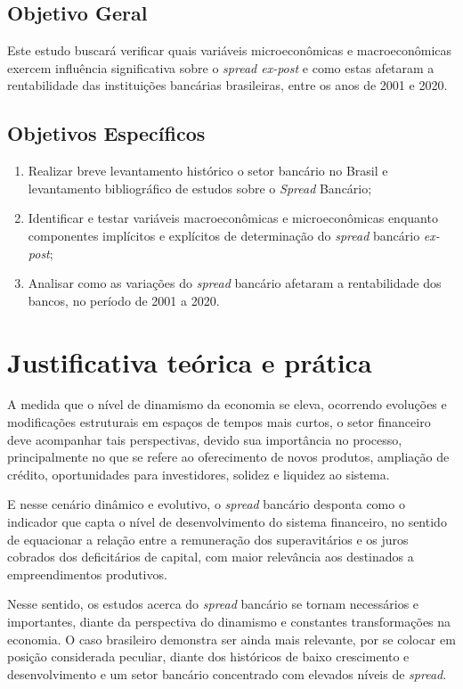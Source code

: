 \documentclass[12pt,12pt,openright,oneside,a4paper,chapter=TITLE,section=TITLE,subsection=TITLE,subsubsection=TITLE,english,french,spanish,portugues,sumario=tradicional]{abntex2}
\providecommand{\tightlist}{%
  \setlength{\itemsep}{0pt}\setlength{\parskip}{0pt}}
\begin{document}
\subsection{Objetivo Geral}

Este estudo buscará verificar quais variáveis microeconômicas e macroeconômicas exercem influência significativa sobre o \emph{spread ex-post} e como estas afetaram a rentabilidade das instituições bancárias brasileiras, entre os anos de 2001 e 2020.

\subsection{Objetivos Específicos}

\begin{enumerate}
\def\labelenumi{\arabic{enumi}.}
\tightlist
\item
  Realizar breve levantamento histórico o setor bancário no Brasil e levantamento bibliográfico de estudos sobre o \emph{Spread} Bancário;
\item
  Identificar e testar variáveis macroeconômicas e microeconômicas enquanto componentes implícitos e explícitos de determinação do \emph{spread} bancário \emph{ex-post};
\item
  Analisar como as variações do \emph{spread} bancário afetaram a rentabilidade dos bancos, no período de 2001 a 2020.
\end{enumerate}

\section{Justificativa teórica e prática}

A medida que o nível de dinamismo da economia se eleva, ocorrendo evoluções e modificações estruturais em espaços de tempos mais curtos, o setor financeiro deve acompanhar tais perspectivas, devido sua importância no processo, principalmente no que se refere ao oferecimento de novos produtos, ampliação de crédito, oportunidades para investidores, solidez e liquidez ao sistema.

E nesse cenário dinâmico e evolutivo, o \emph{spread} bancário desponta como o indicador que capta o nível de desenvolvimento do sistema financeiro, no sentido de equacionar a relação entre a remuneração dos superavitários e os juros cobrados dos deficitários de capital, com maior relevância aos destinados a empreendimentos produtivos.

Nesse sentido, os estudos acerca do \emph{spread} bancário se tornam necessários e importantes, diante da perspectiva do dinamismo e constantes transformações na economia. O caso brasileiro demonstra ser ainda mais relevante, por se colocar em posição considerada peculiar, diante dos históricos de baixo crescimento e desenvolvimento e um setor bancário concentrado com elevados níveis de \emph{spread}.
\end{document}
